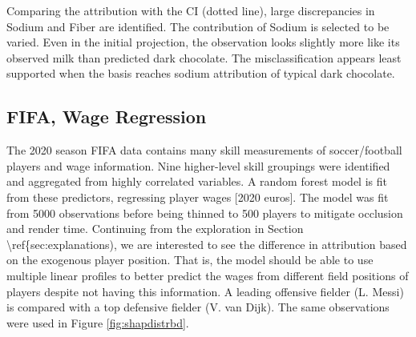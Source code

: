 \documentclass[
]{sn-jnl}
\begin{document}
Comparing the attribution with the CI (dotted line), large discrepancies
in Sodium and Fiber are identified. The contribution of Sodium is
selected to be varied. Even in the initial projection, the observation
looks slightly more like its observed milk than predicted dark
chocolate. The misclassification appears least supported when the basis
reaches sodium attribution of typical dark chocolate.

\hypertarget{fifa-wage-regression}{%
\subsection{FIFA, Wage Regression}\label{fifa-wage-regression}}

The 2020 season FIFA data \citep{leone_fifa_2020, biecek_dalex_2018}
contains many skill measurements of soccer/football players and wage
information. Nine higher-level skill groupings were identified and
aggregated from highly correlated variables. A random forest model is
fit from these predictors, regressing player wages {[}2020 euros{]}. The
model was fit from 5000 observations before being thinned to 500 players
to mitigate occlusion and render time. Continuing from the exploration
in Section \textbackslash ref\{sec:explanations), we are interested to
see the difference in attribution based on the exogenous player
position. That is, the model should be able to use multiple linear
profiles to better predict the wages from different field positions of
players despite not having this information. A leading offensive fielder
(L. Messi) is compared with a top defensive fielder (V. van Dijk). The
same observations were used in Figure \ref{fig:shapdistrbd}.
\end{document}
